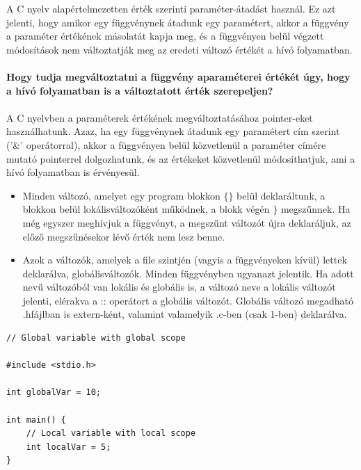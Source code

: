\documentclass[11pt,a4paper]{article}
\begin{document}
            \begin{tcolorbox}[colback=blue!5!white,colframe=blue!50!black,title= 59. Milyen paraméter-átadást használ a C nyelv?]
                A C nyelv alapértelmezetten érték szerinti paraméter-átadást használ. Ez azt jelenti, hogy amikor egy függvénynek átadunk egy paramétert, akkor a függvény a paraméter értékének másolatát kapja meg, és a függvényen belül végzett módosítások nem változtatják meg az eredeti változó értékét a hívó folyamatban.\\ \\
                \textbf{Hogy tudja megváltoztatni a függvény aparaméterei értékét úgy, hogy a hívó folyamatban is a változtatott érték szerepeljen?}\\ \\
                A C nyelvben a paraméterek értékének megváltoztatásához pointer-eket használhatunk. Azaz, ha egy függvénynek átadunk egy paramétert cím szerint ('\&' operátorral), akkor a függvényen belül közvetlenül a paraméter címére mutató pointerrel dolgozhatunk, és az értékeket közvetlenül módosíthatjuk, ami a hívó folyamatban is érvényesül.
            \end{tcolorbox}

            \begin{tcolorbox}[colback=blue!5!white,colframe=blue!50!black,title= 60. Ismertesse a lokális és globális változó fogalmakat!]
                \begin{itemize}
                    \item Minden változó, amelyet egy program blokkon \(\{\}\) belül deklaráltunk, a blokkon belül lokálisváltozóként működnek, a blokk végén \(\}\) megszűnnek. Ha még egyszer meghívjuk a függvényt, a megszűnt változót újra deklaráljuk, az előző megszűnésekor lévő érték nem lesz benne.
                    \item Azok a változók, amelyek a file szintjén (vagyis a függvényeken kívül) lettek deklarálva, globálisváltozók. Minden függvényben ugyanazt jelentik. Ha adott nevű változóból van lokális és globális is, a változó neve a lokális változót jelenti, elérakva a :: operátort a globális változót. Globális változó megadható .hfájlban is extern-ként, valamint valamelyik .c-ben (csak 1-ben) deklarálva.
                \end{itemize}
                \begin{Verbatim}
// Global variable with global scope

#include <stdio.h>

int globalVar = 10;
                      
int main() {
    // Local variable with local scope
    int localVar = 5;
}
                \end{Verbatim}
            \end{tcolorbox}
\end{document}
